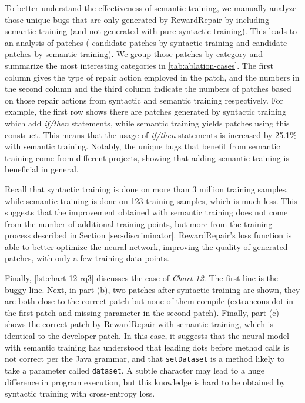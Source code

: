 To better understand the effectiveness of semantic training, we manually analyze those  unique bugs that are only generated by RewardRepair by including semantic training (and not generated with pure syntactic training). This leads to an analysis of  patches ( candidate patches by syntactic training and   candidate patches by semantic training). 
We group those patches by category and summarize the most interesting categories in \autoref{tab:ablation-cases}.  
The first column gives the type of repair action employed in the patch, and the numbers in the second column and the third column indicate the numbers of patches based on those repair actions from syntactic and semantic training respectively.
For example, the first row shows there are  patches generated by syntactic training which add  \textit{if/then} statements,  while semantic training yields  patches using this construct. This means that the usage of \textit{if/then} statements is increased by 25.1\% with semantic training. 
Notably, the unique bugs that benefit from semantic training come from different projects,  showing that adding semantic training is beneficial in general. 

Recall that syntactic training is done on more than 3 million training samples, while semantic training is done on 123 training samples, which is much less.
This suggests that the improvement obtained with semantic training does not come from the number of additional training points, but more from the training process   described in Section \ref{sec-discriminator}. RewardRepair's loss function is able to better optimize the neural network, improving the quality of generated patches, with only a few training data points. 

Finally, \autoref{lst:chart-12-rq3} discusses the case of \textit{Chart-12}.
The first line is the buggy line.
Next, in part (b), two patches after syntactic training are shown, they are both close to the correct patch but none of them compile (extraneous dot in the first patch and missing parameter in the second patch). 
Finally, part (c) shows the correct patch by RewardRepair with semantic training, which is identical to the developer patch.
In this case, it suggests that the neural model with semantic training has understood that leading dots before method calls is not correct per the Java grammar, and that \texttt{setDataset} is a method likely to take a parameter called  \texttt{dataset}.
A subtle character may lead to a huge difference in program execution, but this knowledge is hard to be obtained by syntactic training with cross-entropy loss.

